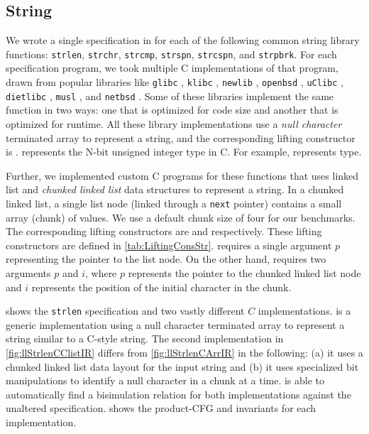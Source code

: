 

\subsection{String}
We wrote a single specification in \SpecL{} for each of the following
common string library functions: {\tt strlen}, {\tt strchr}, {\tt strcmp}, {\tt strspn},
{\tt strcspn}, and {\tt strpbrk}.  For each specification
program, we took multiple C implementations of that program, drawn from popular
libraries like {\tt glibc} \cite{glibc}, {\tt klibc} \cite{klibc}, {\tt newlib} \cite{newlib},
{\tt openbsd} \cite{openbsdlibc}, {\tt uClibc} \cite{uclibc},
{\tt dietlibc} \cite{dietlibc}, {\tt musl} \cite{musl}, and {\tt netbsd} \cite{netbsd}.
Some of these libraries implement the same function in two ways: one that is optimized
for code size and another that is optimized for runtime.
All these library implementations use a {\em null character} terminated array to represent
a string, and the
corresponding lifting constructor is .
 represents the N-bit unsigned integer type in C.
For example,  represents  type.

Further, we implemented custom C programs for these functions that uses linked list
and {\em chunked linked list} data structures to represent a string.
In a chunked linked list, a single list node (linked through a {\tt next} pointer)
contains a small array (chunk) of values.
We use a default chunk size of four for our benchmarks.
The corresponding lifting constructors are 
and  respectively.
These lifting constructors are defined in \cref{tab:LiftingConsStr}.
 requires a single
argument $p$ representing the pointer to the list node.
On the other hand,  requires two arguments $p$
and $i$, where $p$ represents the pointer to the chunked linked list node
and $i$ represents the position of the initial character in the chunk.





 shows the {\tt strlen} specification and two vastly
different $C$ implementations.  is a generic implementation
using a null character terminated array to represent a string similar to a C-style string.
The second implementation in \cref{fig:llStrlenCClistIR} differs from \cref{fig:llStrlenCArrIR}
in the following: (a) it uses a chunked linked list data layout for the input string
and (b) it uses specialized bit manipulations to identify a null character in a chunk at a time.
\toolName{} is able to automatically find a bisimulation relation
for both implementations against the unaltered specification.
 shows the product-CFG and invariants for each implementation.

